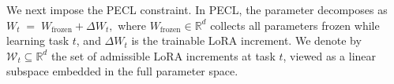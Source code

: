 \documentclass{article}
\theoremstyle{plain}
\theoremstyle{definition}
\theoremstyle{remark}
\begin{document}



We next impose the PECL constraint. In PECL, the parameter decomposes as
$
W_t \;=\; W_{\mathrm{frozen}} + \Delta W_t,
$
where $W_{\mathrm{frozen}}\in\mathbb{R}^d$ collects all parameters frozen while learning task $t$, and $\Delta W_t$ is the trainable LoRA increment. We denote by $\mathcal{W}_t \subseteq \mathbb{R}^d$ the set of admissible LoRA increments at task $t$, viewed as a linear subspace embedded in the full parameter space.
\end{document}
